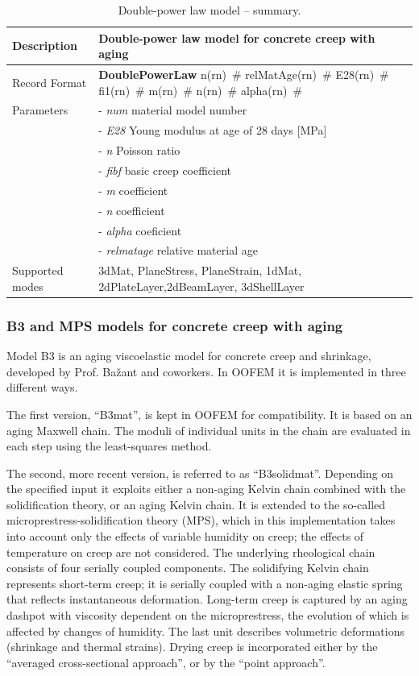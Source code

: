 \documentclass[a4paper]{article}
\newcommand{\descitem}[1]{{\noindent \bf #1}}
\newcommand{\elemparam}[2]{{{#1\tiny (#2)}~\#}}
\newcommand{\param}[1]{{\it #1}}
\begin{document}
\begin{table}[!htb]
\begin{tabular}{|l|p{9cm}|}
\hline
Description & Double-power law model  for concrete creep with aging\\
\hline
Record Format & \descitem{DoublePowerLaw}  \elemparam{n}{rn}
\elemparam{relMatAge}{rn} \elemparam{E28}{rn} \elemparam{fi1}{rn} \elemparam{m}{rn}
\elemparam{n}{rn} \elemparam{alpha}{rn} \\
Parameters &- \param{num} material model number\\
&- \param{E28} Young modulus at age of 28 days [MPa]\\
&- \param{n} Poisson ratio\\
&- \param{fibf} basic creep coefficient\\
&- \param{m} coefficient \\
&- \param{n} coefficient \\
&- \param{alpha} coeficient \\
&- \param{relmatage} relative material age \\
Supported modes& 3dMat, PlaneStress, PlaneStrain, 1dMat,
2dPlateLayer,2dBeamLayer, 3dShellLayer\\
\hline
\end{tabular}
\caption{Double-power law model -- summary.}
\label{doublepowerlaw_table}
\end{table}

\subsubsection{B3 and MPS models for concrete creep with aging}

Model B3 is an aging viscoelastic model for concrete creep and shrinkage, developed by Prof. Ba\v{z}ant and coworkers. In OOFEM it is implemented in three different ways. 

The first version, ``B3mat'', is kept in OOFEM for compatibility. It is based on an aging Maxwell chain. The moduli of individual units in the chain are evaluated in each step using the least-squares method.

The second, more recent version, is referred to as ``B3solidmat''. Depending on the specified input it exploits either a non-aging Kelvin chain combined with the solidification theory, or an aging Kelvin chain. It is extended to the so-called microprestress-solidification theory (MPS), which in this implementation  takes into account only the effects of variable humidity on creep; the effects of temperature on creep are not considered. 
The underlying rheological chain consists of four serially coupled components. The solidifying Kelvin chain represents short-term creep; it is serially coupled with a non-aging elastic spring that reflects instantaneous deformation. Long-term creep is captured by an aging dashpot with viscosity dependent on the microprestress, the evolution of which is affected by changes of humidity. The last  unit describes volumetric deformations (shrinkage and thermal strains).
Drying creep is incorporated either by the 
``averaged cross-sectional approach'', or by the ``point approach''.
\end{document}
